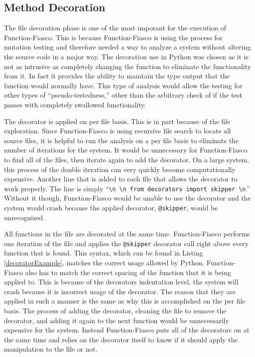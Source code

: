   \subsection{Method Decoration}
    The file decoration phase is one of the most imporant for the execution of Function-Fiasco. This is because Function-Fiasco is using the process for mutation testing and therefore needed a way to analyze a system without altering the source code in a major way. The decoration use in Python was chosen as it is not as intrusive as completely changing the function to eliminate the functionality from it. In fact it provides the ability to maintain the type output that the function would normally have. This type of analysis would allow the testing for other types of ``pseudo-testedness,'' other than the arbitrary check of if the test passes with completely swallowed functionality.

        The decorator is applied on per file basis. This is in part because of the file exploration. Since Function-Fiasco is using recursive file search to locate all source files, it is helpful to run the analysis on a per file basis to eliminate the number of iterations for the system. It would be unnecessary for Function-Fiasco to find all of the files, then iterate again to add the decorator. On a large system, this process of the double iteration can very quickly become computationally expensive. Another line that is added to each file that allows the decorator to work properly. The line is simply ``\texttt{\textbackslash n \textbackslash n from decorators import skipper \textbackslash n}.'' Without it though, Function-Fiasco would be unable to use the decorator and the system would crash because the applied decorator, \texttt{@skipper}, would be unrecognized.

        All functions in the file are decorated at the same time. Function-Fiasco performs one iteration of the file and applies the \texttt{@skipper} decorator call right above every function that is found. This syntax, which can be found in Listing \ref{decoratorExample}, matches the correct usage allowed by Python. Function-Fiasco also has to match the correct spacing of the function that it is being applied to. This is because of the decorators indentation level, the system will crash because it is incorrect usage of the decorator. The reason that they are applied in such a manner is the same as why this is accomplished on the per file basis. The process of adding the decorator, cleaning the file to remove the decorator, and adding it again to the next function would be unnecessarily expensive for the system. Instead Function-Fiasco puts all of the decorators on at the same time and relies on the decorator itself to know if it should apply the manipulation to the file or not.

